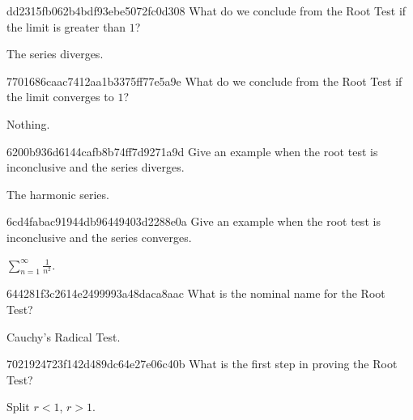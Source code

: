 \begin{note}{dd2315fb062b4bdf93ebe5072fc0d308}
    What do we conclude from the Root Test if the limit is greater than \({ 1 }\)?

    \begin{cloze}{1}
        The series diverges.
    \end{cloze}
\end{note}

\begin{note}{7701686caac7412aa1b3375ff77e5a9e}
    What do we conclude from the Root Test if the limit converges to \({ 1 }\)?

    \begin{cloze}{1}
        Nothing.
    \end{cloze}
\end{note}

\begin{note}{6200b936d6144cafb8b74ff7d9271a9d}
    Give an example when the root test is inconclusive and the series diverges.

    \begin{cloze}{1}
        The harmonic series.
    \end{cloze}
\end{note}

\begin{note}{6cd4fabac91944db96449403d2288e0a}
    Give an example when the root test is inconclusive and the series converges.

    \begin{cloze}{1}
        \({ \sum_{n=1}^{\infty} \frac{1}{n^2} }\).
    \end{cloze}
\end{note}

\begin{note}{644281f3c2614e2499993a48daca8aac}
    What is the nominal name for the Root Test?

    \begin{cloze}{1}
        Cauchy's Radical Test.
    \end{cloze}
\end{note}

\begin{note}{7021924723f142d489dc64e27e06c40b}
    What is the first step in proving the Root Test?

    \begin{cloze}{1}
        Split \({ r < 1 }\), \({ r > 1 }\).
    \end{cloze}
\end{note}

